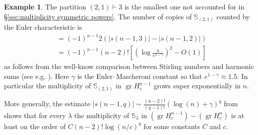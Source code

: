 \documentclass[12pt]{article}
\newcommand{\Schur}[1]{\mathbb{S}_{#1}}
\DeclareMathOperator{\gr}{gr}
\theoremstyle{plain}
\theoremstyle{definition}
\newtheorem{expl}[thm]{Example}
\theoremstyle{remark}
\begin{document}
\begin{expl}\label{super-exponential (2,1)}
The partition $(2,1)\vdash 3$ is the smallest one not accounted for in \S\ref{sec:multiplicity symmetric powers}. The number of copies of $\Schur{(2,1)}$ counted by the Euler characteristic is 
\begin{equation}
\begin{split}
&= (-1)^{n-1}2\left(|s(n-1,3)|-|s(n-1,2)|\right)\\
&= (-1)^{n-1}(n-2)!\left[ {\left(\log\frac{n}{e^{1-\gamma}}\right)}^2 - O(1) \right]
\end{split}
\end{equation}
as follows from the well-know comparison between Stirling numbers and harmonic sums (see e.g. \cite{adamchik-stirling}). Here $\gamma$ is the Euler–Mascheroni constant so that $e^{1-\gamma} \approx 1.5$. In particular the multiplicity of $\Schur{(2,1)}$ in $\gr H^{n-1}_c$ grows super exponentially in $n$.
\end{expl}

More generally, the estimate $|s(n-1,q)| \sim \frac{(n-2)!}{(q-1)!}(\log(n)+\gamma)^q$ from \cite{adamchik-stirling} shows that for every $\lambda$ the multiplicity of $\Schur{\lambda}$ in $(\gr H^{n-1}_c) - (\gr H^{n}_c)$ is at least on the order of $C(n-2)!\log(n/c)^q$ for some constants $C$ and $c$.
\end{document}
